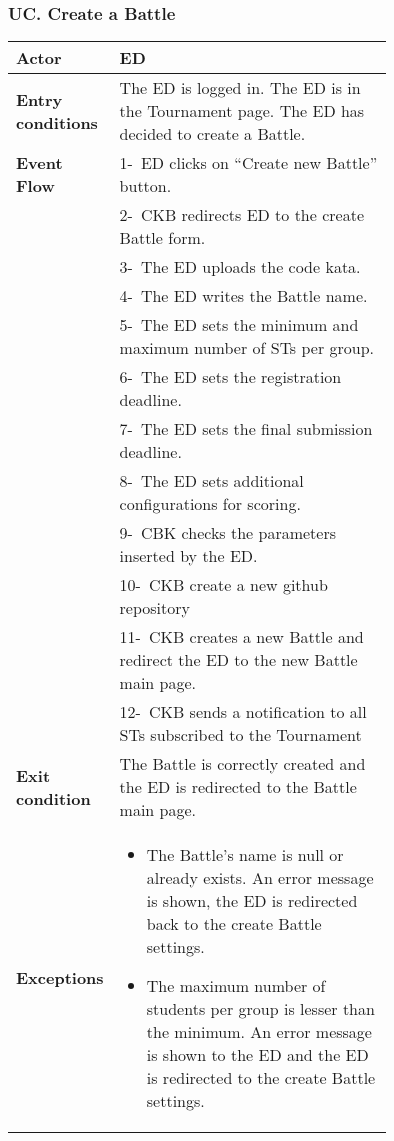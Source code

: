 \subsubsection*{UC\cuc . Create a Battle}
\begin{center}
    \begin{longtable}{|l|p{0.75\linewidth}|}
        \hline
        \textbf{Actor}            & ED \\
        \hline
        \textbf{Entry conditions} & The ED is logged in. The ED is in the Tournament page. The ED has decided to create a Battle.        \\
        \hline
        \textbf{Event Flow}       & 1-\ ED clicks on “Create new Battle” button.        \\
        & 2-\ CKB redirects ED to the create Battle form.        \\
        & 3-\ The ED uploads the code kata.        \\
        & 4-\ The ED writes the Battle name.        \\
        & 5-\ The ED sets the minimum and maximum number of STs per group.        \\
        & 6-\ The ED sets the registration deadline.      \\
        & 7-\ The ED sets the final submission deadline.      \\
        & 8-\ The ED sets additional configurations for scoring.        \\
        & 9-\ CBK checks the parameters inserted by the ED.        \\
        & 10-\ CKB create a new github repository \\
        & 11-\ CKB creates a new Battle and redirect the ED to the new Battle main page.        \\
        & 12-\ CKB sends a notification to all STs subscribed to the Tournament         \\
        \hline
        \textbf{Exit condition}   & The Battle is correctly created and the ED is redirected to the Battle main page.        \\
        \hline
        \textbf{Exceptions}        & \begin{itemize}
                \item The Battle’s name is null or already exists. An error message is shown, the ED is redirected back to the create Battle settings.
                \item The maximum number of students per group is lesser than the minimum.  An error message is shown to the ED and the ED is redirected to the create Battle settings.

\end{itemize}
\end{longtable}
\end{center}
